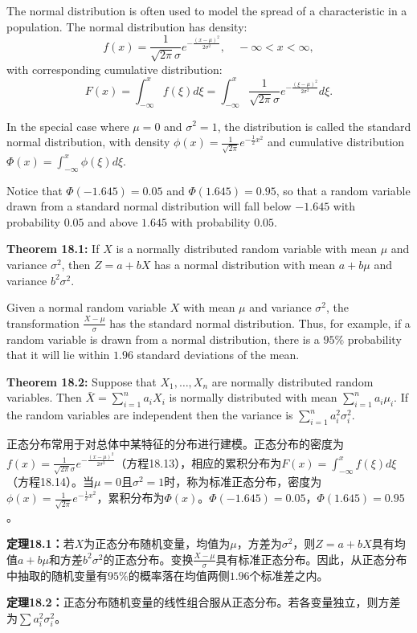 \begin{original}
The normal distribution is often used to model the spread of a characteristic in a population. The normal distribution has density:
\[
f(x) = \frac{1}{\sqrt{2\pi}\sigma} e^{-\frac{(x-\mu)^2}{2\sigma^2}}, \quad -\infty < x < \infty, \tag{18.13}
\]
with corresponding cumulative distribution:
\[
F(x) = \int_{-\infty}^{x} f(\xi)d\xi = \int_{-\infty}^{x} \frac{1}{\sqrt{2\pi}\sigma} e^{-\frac{(\xi-\mu)^2}{2\sigma^2}} d\xi. \tag{18.14}
\]

In the special case where $\mu = 0$ and $\sigma^2 = 1$, the distribution is called the standard normal distribution, with density $\phi(x) = \frac{1}{\sqrt{2\pi}} e^{-\frac{1}{2}x^2}$ and cumulative distribution $\Phi(x) = \int_{-\infty}^{x} \phi(\xi)d\xi$.

Notice that $\Phi(-1.645) = 0.05$ and $\Phi(1.645) = 0.95$, so that a random variable drawn from a standard normal distribution will fall below $-1.645$ with probability $0.05$ and above $1.645$ with probability $0.05$.

\textbf{Theorem 18.1:} If $X$ is a normally distributed random variable with mean $\mu$ and variance $\sigma^2$, then $Z = a + bX$ has a normal distribution with mean $a + b\mu$ and variance $b^2\sigma^2$.

Given a normal random variable $X$ with mean $\mu$ and variance $\sigma^2$, the transformation $\frac{X-\mu}{\sigma}$ has the standard normal distribution. Thus, for example, if a random variable is drawn from a normal distribution, there is a $95\%$ probability that it will lie within $1.96$ standard deviations of the mean.

\textbf{Theorem 18.2:} Suppose that $X_1, \ldots, X_n$ are normally distributed random variables. Then $\bar{X} = \sum_{i=1}^{n} a_i X_i$ is normally distributed with mean $\sum_{i=1}^{n} a_i \mu_i$. If the random variables are independent then the variance is $\sum_{i=1}^{n} a_i^2 \sigma_i^2$.
\end{original}
\begin{translation}
正态分布常用于对总体中某特征的分布进行建模。正态分布的密度为$f(x) = \frac{1}{\sqrt{2\pi}\sigma} e^{-\frac{(x-\mu)^2}{2\sigma^2}}$（方程18.13），相应的累积分布为$F(x) = \int_{-\infty}^{x} f(\xi)d\xi$（方程18.14）。当$\mu = 0$且$\sigma^2 = 1$时，称为标准正态分布，密度为$\phi(x) = \frac{1}{\sqrt{2\pi}} e^{-\frac{1}{2}x^2}$，累积分布为$\Phi(x)$。$\Phi(-1.645) = 0.05$，$\Phi(1.645) = 0.95$。

\textbf{定理18.1：}若$X$为正态分布随机变量，均值为$\mu$，方差为$\sigma^2$，则$Z = a + bX$具有均值$a + b\mu$和方差$b^2\sigma^2$的正态分布。变换$\frac{X-\mu}{\sigma}$具有标准正态分布。因此，从正态分布中抽取的随机变量有$95\%$的概率落在均值两侧$1.96$个标准差之内。

\textbf{定理18.2：}正态分布随机变量的线性组合服从正态分布。若各变量独立，则方差为$\sum a_i^2 \sigma_i^2$。
\end{translation}

